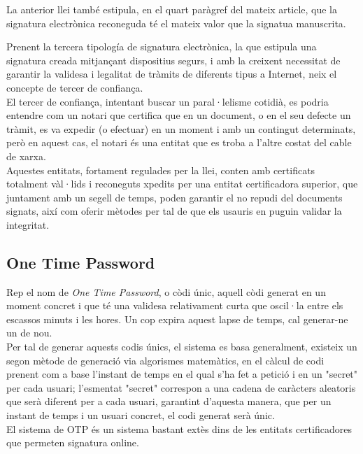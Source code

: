 La anterior llei també estipula, en el quart paràgref del mateix article, que la signatura electrònica reconeguda té el mateix valor que la signatua manuscrita.

Prenent la tercera tipología de signatura electrònica, la que estipula una signatura creada mitjançant dispositius segurs, i amb la creixent necessitat de garantir la validesa i legalitat de tràmits de diferents tipus a Internet, neix el concepte de tercer de confiança.\\
\newline El tercer de confiança, intentant buscar un paral·lelisme cotidià, es podria entendre com un notari que certifica que en un document, o en el seu defecte un tràmit, es va expedir (o efectuar) en un moment i amb un contingut determinats, però en aquest cas, el notari és una entitat que es troba a l'altre costat del cable de xarxa.\\
\newline Aquestes entitats, fortament regulades per la llei, conten amb certificats totalment vàl·lids i reconeguts xpedits per una entitat certificadora superior, que juntament amb un segell de temps, poden garantir el no repudi del documents signats, així com oferir mètodes per tal de que els usauris en puguin validar la integritat.

\subsection{One Time Password}
Rep el nom de \textit{One Time Password}, o còdi únic, aquell còdi generat en un moment concret i que té una validesa relativament curta que oscil·la entre els escassos minuts i les hores. Un cop expira aquest lapse de temps, cal generar-ne un de nou.\\
\newline Per tal de generar aquests codis únics, el sistema es basa generalment, existeix un segon mètode de generació via algorismes matemàtics, en el càlcul de codi prenent com a base l'instant de temps en el qual s'ha fet a petició i en un "secret" per cada usuari; l'esmentat "secret" correspon a una cadena de caràcters aleatoris que serà diferent per a cada usuari, garantint d'aquesta manera, que per un instant de temps i un usuari concret, el codi generat serà únic.\\
\newline El sistema de OTP és un sistema bastant extès dins de les entitats certificadores que permeten signatura online.

